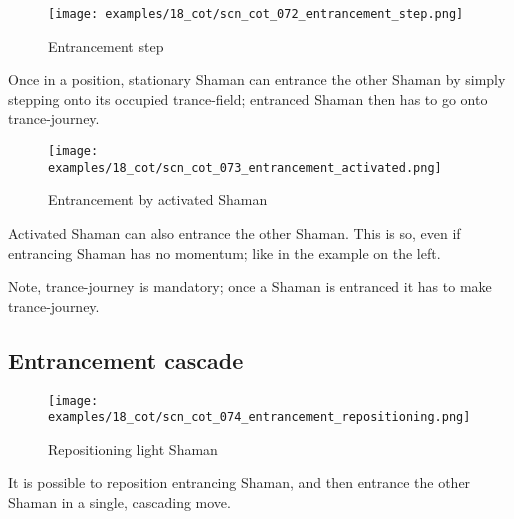 \clearpage %

\noindent
\begin{wrapfigure}[6]{l}{0.4\textwidth}
\centering
\texttt{[image: examples/18\_cot/scn\_cot\_072\_entrancement\_step.png]}
\vspace*{-0.4\baselineskip}
\caption{Entrancement step}
\label{fig:scn_cot_072_entrancement_step}
\end{wrapfigure}
Once in a position, stationary Shaman can entrance the other Shaman by simply stepping
onto its occupied trance-field; entranced Shaman then has to go onto trance-journey.

\vspace*{5.1\baselineskip}

\noindent
\begin{wrapfigure}[8]{l}{0.4\textwidth}
\centering
\texttt{[image: examples/18\_cot/scn\_cot\_073\_entrancement\_activated.png]}
\vspace*{-0.4\baselineskip}
\caption{Entrancement by activated Shaman}
\label{fig:scn_cot_073_entrancement_activated}
\end{wrapfigure}
Activated Shaman can also entrance the other Shaman. This is so, even if entrancing
Shaman has no momentum; like in the example on the left.

Note, trance-journey is mandatory; once a Shaman is entranced it has to make
trance-journey.

\clearpage %

\subsection*{Entrancement cascade}
\label{sec:Conquest of Tlalocan/Trance-journey/Entrancement cascade}

\noindent
\begin{wrapfigure}[9]{l}{0.4\textwidth}
\centering
\texttt{[image: examples/18\_cot/scn\_cot\_074\_entrancement\_repositioning.png]}
\vspace*{-0.4\baselineskip}
\caption{Repositioning light Shaman}
\label{fig:scn_cot_074_entrancement_repositioning}
\end{wrapfigure}
It is possible to reposition entrancing Shaman, and then entrance the other Shaman
in a single, cascading move.

